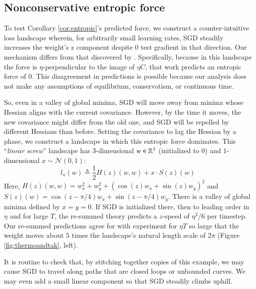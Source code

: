 \documentclass{article}
\theoremstyle{plain}
\theoremstyle{definition}
\newcommand{\Nn}{\mathcal{N}}   \newcommand{\NN}{\mathbb{N}}
\begin{document}
    \subsection{Nonconservative entropic force} \label{subsect:entropic}
        To test Corollary \ref{cor:entropic}'s predicted force, we construct a
        counter-intuitive loss landscape wherein, for arbitrarily small
        learning rates, SGD steadily increases the weight's z component despite
        0 test gradient in that direction.  Our mechanism differs from that
        discovered by \citet{ch18}.  Specifically, because in this landscape
        the force is $\eta$-perpendicular to the image of $\eta C$, that work
        predicts an entropic force of $0$.  This disagreement in predictions is
        possible because our analysis does not make any assumptions of
        equilibrium, conservatism, or continuous time.

       
        So, even in a valley of global minima,
        SGD will move away from minima whose Hessian aligns with the current
        covariance.  However, by the time it moves, the new covariance might
        differ from the old one, and SGD will be repelled by different Hessians
        than before.  Setting the covariance to lag the Hessian by a phase, we
        construct a landscape in which this entropic force dominates.  This
        ``\emph{linear screw}'' landscape has
        $3$-dimensional $w\in \mathbb{R}^3$ (initialized to $0$) and
        $1$-dimensional $x \sim \Nn(0, 1)$:
        $$
            l_x(w)
            \triangleq
            \frac{1}{2} H(z)(w, w) + x \cdot S(z)(w)  
        $$
        Here, $H(z)(w, w) = w_x^2 + w_y^2 + (\cos(z) w_x + \sin(z) w_y)^2$
        and   $S(z)(w)    = \cos(z-\pi/4) w_x + \sin(z-\pi/4) w_y$.
        There is a valley of global minima defined by $x=y=0$. 
        If SGD is initialized there, then to leading order in $\eta$ and for
        large $T$, the re-summed theory predicts a $z$-speed of $\eta^2/6$ 
        per timestep.  Our re-summed predictions agree for
        with experiment for $\eta T$ so large that the weight moves about $5$
        times the landscape's natural length scale of $2\pi$ (Figure
        \ref{fig:thermoandtak}, left).

        It is routine to check that, by stitching together copies of this
        example, we may cause SGD to travel along paths that are closed loops
        or unbounded curves.  We may even add a small linear component so
        that SGD steadily climbs uphill.  
\end{document}
